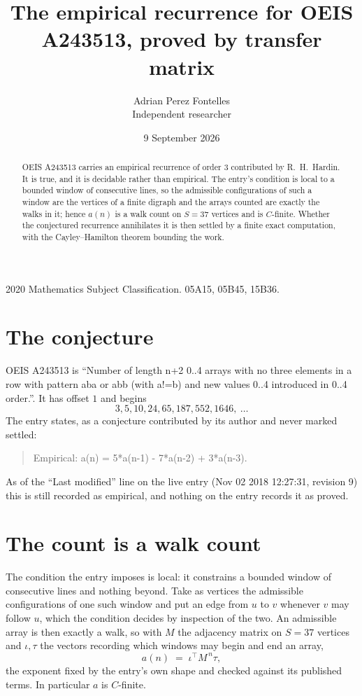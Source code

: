 \documentclass[11pt,a4paper]{article}
\title{The empirical recurrence for OEIS A243513, proved by transfer matrix}
\author{Adrian Perez Fontelles\\ \small Independent researcher}
\date{9 September 2026}
\theoremstyle{plain}
\theoremstyle{definition}
\begin{document}
\maketitle

\begin{abstract}
OEIS A243513 carries an empirical recurrence of order $3$ contributed by R.~H.~Hardin. It is
true, and it is decidable rather than empirical. The entry's condition is local to a bounded window of consecutive lines, so
the admissible configurations of such a window are the vertices of a finite digraph and the
arrays counted are exactly the walks in it; hence $a(n)$ is a walk count on $S=37$ vertices
and is $C$-finite. Whether the conjectured recurrence annihilates it is then settled by a
finite exact computation, with the Cayley--Hamilton theorem bounding the work.
\end{abstract}

\noindent\small 2020 Mathematics Subject Classification. 05A15, 05B45, 15B36.\normalsize

\section{The conjecture}

OEIS A243513 is ``Number of length n+2 0..4 arrays with no three elements in a row with pattern aba or abb (with a!=b) and new values 0..4 introduced in 0..4 order.''. It has offset $1$ and begins
\[
3, 5, 10, 24, 65, 187, 552, 1646,\ \dots
\]
The entry states, as a conjecture contributed by its author and never marked settled:
\begin{quote}
Empirical: a(n) = 5*a(n-1) - 7*a(n-2) + 3*a(n-3).
\end{quote}
As of the ``Last modified'' line on the live entry (Nov 02 2018 12:27:31, revision 9) this is still
recorded as empirical, and nothing on the entry records it as proved.

\section{The count is a walk count}

The condition the entry imposes is local: it constrains a bounded window of consecutive lines and nothing beyond. Take as
vertices the admissible configurations of one such window and put an edge from $u$ to $v$
whenever $v$ may follow $u$, which the condition decides by inspection of the two. An
admissible array is then exactly a walk, so with $M$ the adjacency matrix on $S=37$ vertices
and $\iota,\tau$ the vectors recording which windows may begin and end an array,
\[
a(n)\;=\;\iota^{\!\top}M^{\,n}\tau ,
\]
the exponent fixed by the entry's own shape and checked against its published terms. In
particular $a$ is $C$-finite.
\end{document}
